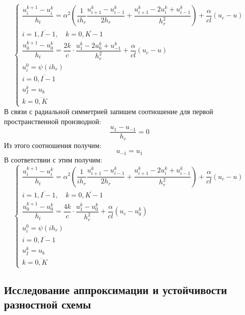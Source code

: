 \documentclass[a4paper,14pt,russian, leqno, fleqn]{extreport}
\begin{document}
	\begin{equation}
		\left\{\begin{array}{l}
		\dfrac{u_i^{k+1}-u_i^k}{h_t} = \alpha^2\left(\dfrac{1}{ih_r}\dfrac{u_{i+1}^k - u_{i-1}^k}{2h_r} +\dfrac{u_{i+1}^k - 2u_i^k + u_{i-1}^k}{h^2_r}\right) + \dfrac{\alpha}{cl}\left (u_c - u \right) \\
		i = \overline{1,I-1}, \quad k = \overline{0,K-1}	 \\
		\dfrac{u_0^{k+1}-u_0^k}{h_t} = \dfrac{2k}{c}\cdot\dfrac{u_1^k-2u_0^k+u_{-1}^k}{h_r^2} + \dfrac{\alpha}{cl}(u_c-u) \\
		u_i^0 = \psi(ih_r) \\
		i = \overline{0, I-1} \\
		u_I^k = u_b \\
		k = \overline{0,K}

	\end{array}\right.
	\end{equation}
	В связи с радиальной симметрией запишем соотношение для первой пространственной производной:
	\begin{equation}
		\dfrac{u_1 - u_{-1}}{h_r} = 0
	\end{equation}
	Из этого соотношения получим:
	\begin{equation}
		u_{-1} = u_1
	\end{equation}
	В соответствии с этим получим:
	\begin{equation}
		\left\{\begin{array}{l}
		\dfrac{u_i^{k+1}-u_i^k}{h_t} = \alpha^2\left(\dfrac{1}{ih_r}\dfrac{u_{i+1}^k - u_{i-1}^k}{2h_r} +\dfrac{u_{i+1}^k - 2u_i^k + u_{i-1}^k}{h^2_r}\right) + \dfrac{\alpha}{cl}\left (u_c - u \right) \\
		i = \overline{1,I-1}, \quad k = \overline{0,K-1}	 \\
		\dfrac{u_0^{k+1}-u_0^k}{h_t} = \dfrac{4k}{c}\cdot\dfrac{u_1^k-u_0^k}{h_r^2} + \dfrac{\alpha}{cl}(u_c-u_0^k) \\
		u_i^0 = \psi(ih_r) \\
		i = \overline{0, I-1} \\
		u_I^k = u_b \\
		k = \overline{0,K}
	\end{array}\right.
	\end{equation}

	\subsection{Исследование аппроксимации и устойчивости разностной схемы}
	
\end{document}
